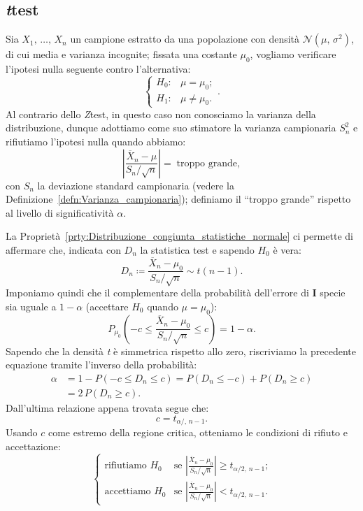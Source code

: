         \subsection{\emph{t}\nbdash test}\label{sec:t_test}
            \begin{defn}[Bilatero]
                Sia $X_1,\, \ldots,\, X_{n}$ un campione estratto da una popolazione con densità 
                $\mathcal{N}(\mu,\,\sigma^2)$, di cui media e varianza incognite; fissata una costante 
                $\mu_0$, vogliamo verificare l'ipotesi nulla seguente contro l'alternativa: \[
                    \begin{cases}
                        H_0 : & \mu = \mu_0; \\
                        H_1 : & \mu \neq \mu_0.
                    \end{cases}
                .\] Al contrario dello \emph{Z}\nbdash test, in questo caso non conosciamo la varianza della 
                distribuzione, dunque adottiamo come suo stimatore la varianza campionaria $S_n^2$ e 
                rifiutiamo l'ipotesi nulla quando abbiamo: \[
                \left|\frac{\overline{X}_n -\mu}{S_n /\sqrt{n}}\right| =\; \text{troppo grande}
            ,\] con $S_n$ la deviazione standard campionaria (vedere la 
            Definizione~\ref{defn:Varianza_campionaria}); definiamo il ``troppo grande'' rispetto al livello 
            di significatività $\alpha$.

            La Proprietà~\ref{prty:Distribuzione_congiunta_statistiche_normale} ci permette di affermare che, 
            indicata con $D_n$ la statistica test e sapendo $H_0$ è vera: \[
                D_n \coloneqq \frac{\overline{X}_n -\mu_0}{S_n /\sqrt{n}} \sim t(n-1)
            .\] Imponiamo quindi che il complementare della probabilità dell'errore di $\mathbf{I}$ specie sia 
            uguale a $1-\alpha$ (accettare $H_0$ quando $\mu = \mu_0$): \[
                P_{\mu_0}\left(-c \leq \frac{\overline{X}_n -\mu_0}{S_n /\sqrt{n}} \leq c\right) = 1-\alpha
            .\] Sapendo che la densità \emph{t} è simmetrica rispetto allo zero, riscriviamo la precedente 
            equazione tramite l'inverso della probabilità:
            \begin{align*}
                \alpha &= 1-P(-c \leq D_n \leq c) = P(D_n \leq -c) + P(D_n \geq c) \\
                &= 2\, P(D_n \geq c)
            .\end{align*}
            Dall'ultima relazione appena trovata segue che: \[
                c = t_{\alpha /,\, n-1}
            .\] Usando $c$ come estremo della regione critica, otteniamo le condizioni di rifiuto e 
            accettazione: \[
                \begin{cases}
                    \text{rifiutiamo } H_0 & 
                    \text{se $\left|\frac{\overline{X}_n -\mu_0}{S_n /\sqrt{n}}\right| \geq t_{\alpha /2,\, n-1}$;} \\
                    \text{accettiamo } H_0 & 
                    \text{se $\left|\frac{\overline{X}_n -\mu_0}{S_n /\sqrt{n}}\right| < t_{\alpha /2,\, n-1}$.}
                \end{cases}
            \]
            \end{defn}
